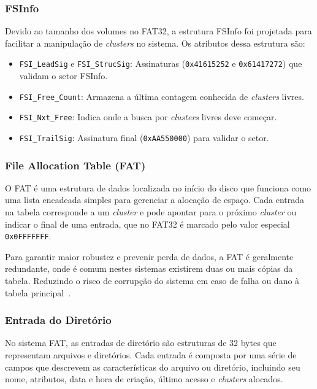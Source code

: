 \documentclass[
    12pt,				%
    oneside,   	        %
    a4paper,			%
    english,			%
    french,				%
    spanish,			%
    brazil,				%
    ]{pacotes/abntex2}
\begin{document}
\subsubsection{FSInfo}
\label{subsubsec:fsinfo}

Devido ao tamanho dos volumes no FAT32, a estrutura FSInfo foi projetada para facilitar a manipulação de \textit{clusters} no sistema. Os atributos dessa estrutura são:

\begin{itemize}
    \item \texttt{FSI\_LeadSig} e \texttt{FSI\_StrucSig}: Assinaturas (\texttt{0x41615252} e \texttt{0x61417272}) que validam o setor FSInfo.
    \item \texttt{FSI\_Free\_Count}: Armazena a última contagem conhecida de \textit{clusters} livres.
    \item \texttt{FSI\_Nxt\_Free}: Indica onde a busca por \textit{clusters} livres deve começar.
    \item \texttt{FSI\_TrailSig}: Assinatura final (\texttt{0xAA550000}) para validar o setor.
\end{itemize}

\subsubsection{File Allocation Table (FAT)}
\label{subsubsec:fat}

O FAT é uma estrutura de dados localizada no início do disco que funciona como uma lista encadeada simples para gerenciar a alocação de espaço. Cada entrada na tabela corresponde a um \textit{cluster} e pode apontar para o próximo \textit{cluster} ou indicar o final de uma entrada, que no FAT32 é marcado pelo valor especial \texttt{0x0FFFFFFF}.

Para garantir maior robustez e prevenir perda de dados, a FAT é geralmente redundante, onde é comum nestes sistemas existirem duas ou mais cópias da tabela. Reduzindo o risco de corrupção do sistema em caso de falha ou dano à tabela principal~\cite{microsoft2000}.

\subsubsection{Entrada do Diretório}
\label{subsubsec:dentry}

No sistema FAT, as entradas de diretório são estruturas de 32 bytes que representam arquivos e diretórios. Cada entrada é composta por uma série de campos que descrevem as características do arquivo ou diretório, incluindo seu nome, atributos, data e hora de criação, último acesso e \textit{clusters} alocados.
\end{document}

